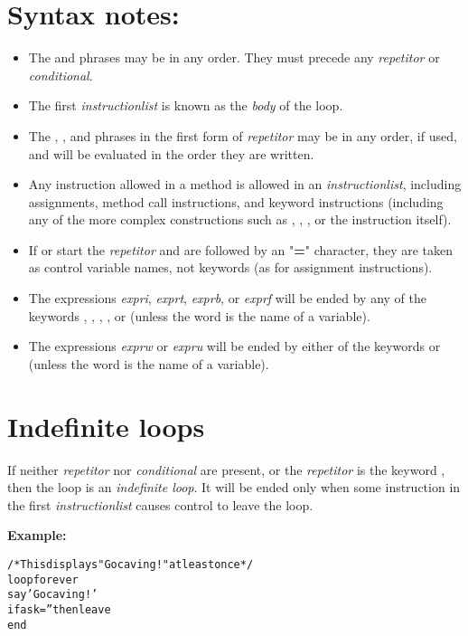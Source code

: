 \section{Syntax notes:}
\begin{itemize}
\item 
The  and  phrases may be in any order.
They must precede any \emph{repetitor} or \emph{conditional}.
\item 
{}
The first \emph{instructionlist} is known as the \emph{body} of
the loop.
\item 
The , , and  phrases in the first form
of \emph{repetitor} may be in any order, if used, and will be
evaluated in the order they are written.
\item 
Any instruction allowed in a method is allowed in an
\emph{instructionlist}, including assignments, method call
instructions, and keyword instructions (including any of the more
complex constructions such as , , ,
or the  instruction itself).
\item 
If  or  start the \emph{repetitor} and
are followed by an "\textbf{=}" character, they are taken as
control variable names, not keywords (as for assignment instructions).
\item 
The expressions \emph{expri}, \emph{exprt}, \emph{exprb}, or
\emph{exprf} will be ended by any of the keywords ,
, , , or  (unless
the word is the name of a variable).
\item 
The expressions \emph{exprw} or \emph{expru} will be ended by
either of the keywords  or  (unless the
word is the name of a variable).
\end{itemize}
\section{Indefinite loops}
 If neither \emph{repetitor} nor \emph{conditional} are
present, or the \emph{repetitor} is the keyword ,
then the loop is an \emph{indefinite loop}.
It will be ended only when some instruction in the first
\emph{instructionlist} causes control to leave the loop.

\textbf{Example:}
\begin{alltt}
/* This displays "Go caving!" at least once */
loop forever
  say 'Go caving!'
  if ask='' then leave
  end
\end{alltt}
